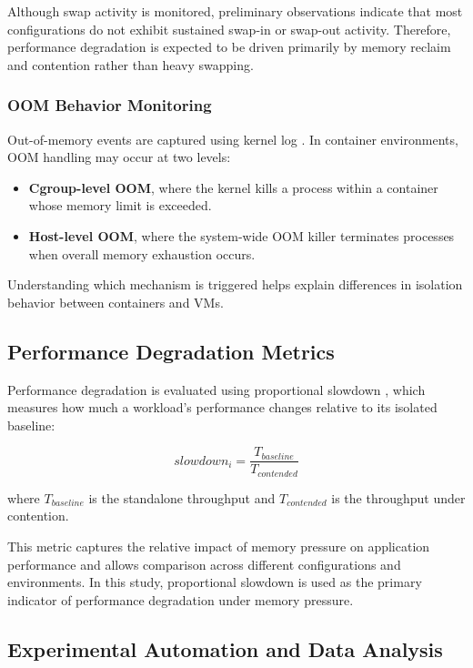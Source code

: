 \documentclass[conference]{IEEEtran}
\begin{document}
Although swap activity is monitored, preliminary observations indicate that most configurations do not exhibit sustained swap-in or swap-out activity. Therefore, performance degradation is expected to be driven primarily by memory reclaim and contention rather than heavy swapping.

\subsubsection{OOM Behavior Monitoring}

Out-of-memory events are captured using kernel log \cite{linux_oom}. In container environments, OOM handling may occur at two levels:

\begin{itemize}
\item \textbf{Cgroup-level OOM}, where the kernel kills a process within a container whose memory limit is exceeded.
\item \textbf{Host-level OOM}, where the system-wide OOM killer terminates processes when overall memory exhaustion occurs.
\end{itemize}

Understanding which mechanism is triggered helps explain differences in isolation behavior between containers and VMs.

\subsection{Performance Degradation Metrics}

Performance degradation is evaluated using proportional slowdown \cite{hennessy2017computer}, which measures how much a workload’s performance changes relative to its isolated baseline:

\[
slowdown_i = \frac{T_{baseline}}{T_{contended}}
\]

where $T_{baseline}$ is the standalone throughput and $T_{contended}$ is the throughput under contention.

This metric captures the relative impact of memory pressure on application performance and allows comparison across different configurations and environments. In this study, proportional slowdown is used as the primary indicator of performance degradation under memory pressure.

\subsection{Experimental Automation and Data Analysis}
\end{document}
